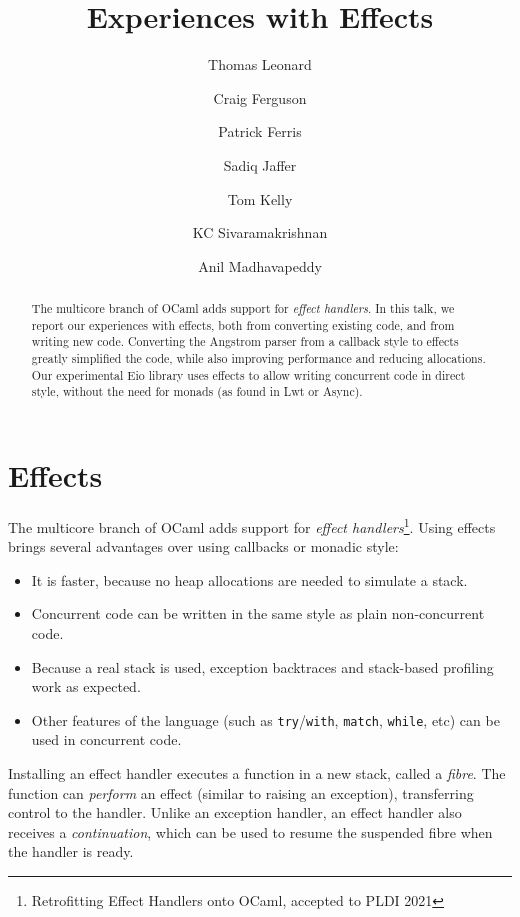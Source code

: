 \documentclass[a4paper,twocolumn]{article}
\begin{document}
\title{Experiences with Effects}
\author{Thomas Leonard\and
        Craig Ferguson\and
        Patrick Ferris\and
        Sadiq Jaffer\and
        Tom Kelly\and
        KC Sivaramakrishnan\and
        Anil Madhavapeddy}
\maketitle

\begin{abstract}
The multicore branch of OCaml adds support for \emph{effect handlers}.
In this talk, we report our experiences with effects,
both from converting existing code, and from writing new code.
Converting the Angstrom parser from a callback style to effects
greatly simplified the code, while also improving performance and reducing allocations.
Our experimental Eio library uses effects to allow writing concurrent code in direct style,
without the need for monads (as found in Lwt or Async).

\end{abstract}

\section*{Effects}

The multicore branch of OCaml adds support for \emph{effect handlers}\footnote{Retrofitting Effect Handlers onto OCaml, accepted to PLDI 2021}.
Using effects brings several advantages over using callbacks or monadic style:

\begin{itemize}
\item It is faster, because no heap allocations are needed to simulate a stack.
\item Concurrent code can be written in the same style as plain non-concurrent code.
\item Because a real stack is used, exception backtraces and stack-based profiling work as expected.
\item Other features of the language (such as {\tt try}/{\tt with}, {\tt match}, {\tt while}, etc)
can be used in concurrent code.
\end{itemize}

Installing an effect handler executes a function in a new stack, called a \emph{fibre}.
The function can \emph{perform} an effect (similar to raising an exception), transferring control to the handler.
Unlike an exception handler, an effect handler also receives a \emph{continuation},
which can be used to resume the suspended fibre when the handler is ready.
\end{document}
